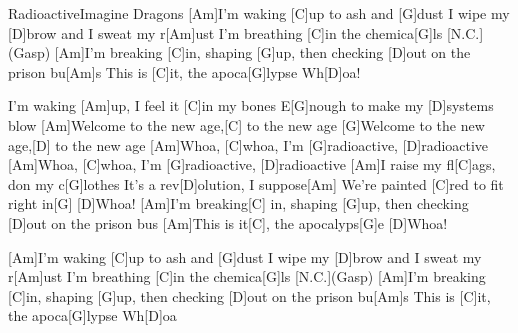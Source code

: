 \documentclass[../main.tex]{subfiles}
\begin{document}
\begin{song}[2]{Radioactive}{Imagine Dragons}{}
[Am]I'm waking [C]up to ash and [G]dust
I wipe my [D]brow and I sweat my r[Am]ust
I'm breathing [C]in the chemica[G]ls  [N.C.](Gasp)
[Am]I'm breaking [C]in, shaping [G]up, then checking [D]out on the prison bu[Am]s
This is [C]it, the apoca[G]lypse
Wh[D]oa!

I'm waking [Am]up, I feel it [C]in my bones
E[G]nough to make my [D]systems blow
[Am]Welcome to the new age,[C] to the new age
[G]Welcome to the new age,[D] to the new age
[Am]Whoa, [C]whoa, I'm [G]radioactive, [D]radioactive
[Am]Whoa, [C]whoa, I'm [G]radioactive, [D]radioactive
[Am]I raise my fl[C]ags, don my c[G]lothes
It's a rev[D]olution, I suppose[Am]{\hh}
We're painted [C]red to fit right in[G]{\hh}
[D]Whoa!
[Am]I'm breaking[C] in, shaping [G]up, then checking [D]out on the prison bus
[Am]This is it[C], the apocalyps[G]e
[D]Whoa!

[Am]I'm waking [C]up to ash and [G]dust
I wipe my [D]brow and I sweat my r[Am]ust
I'm breathing [C]in the chemica[G]ls  [N.C.](Gasp)
[Am]I'm breaking [C]in, shaping [G]up, then checking [D]out on the prison bu[Am]s
This is [C]it, the apoca[G]lypse
Wh[D]oa

\end{song}
\end{document}
